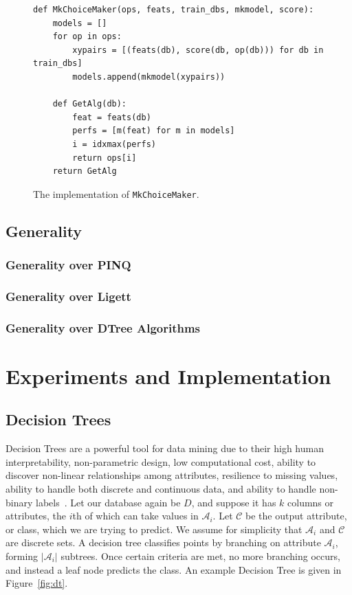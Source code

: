 \documentclass[11pt]{report}
\renewcommand{\t}[1]{\texttt{#1}}
\begin{document}
\begin{figure}
\begin{lstlisting}[style=MyPythonStyle]
def MkChoiceMaker(ops, feats, train_dbs, mkmodel, score):
    models = []
    for op in ops:
        xypairs = [(feats(db), score(db, op(db))) for db in train_dbs]
        models.append(mkmodel(xypairs))

    def GetAlg(db):
        feat = feats(db)
        perfs = [m(feat) for m in models]
        i = idxmax(perfs)
        return ops[i]
    return GetAlg
\end{lstlisting}
\caption{The implementation of \t{MkChoiceMaker}. }\label{fig:choicemaker}
\end{figure}
\section{Generality}
\subsection{Generality over PINQ}
\subsection{Generality over Ligett}
\subsection{Generality over DTree Algorithms}
\chapter{Experiments and Implementation}\label{ch:experiments}
\section{Decision Trees}

Decision Trees are a powerful tool for data mining due to their high human interpretability, non-parametric design, low computational cost, ability to discover non-linear relationships among attributes, resilience to missing values, ability to handle both discrete and continuous data, and ability to handle non-binary labels~\cite{Fletcher:2016}. Let our database again be $D$, and suppose it has $k$ columns or attributes, the $i$th of which can take values in $\mathcal{A}_i$. Let $\mathcal{C}$ be the output attribute, or class, which we are trying to predict. We assume for simplicity that $\mathcal{A}_i$ and $\mathcal{C}$ are discrete sets. A decision tree classifies points by branching on attribute $\mathcal{A}_i$, forming $|\mathcal{A}_i|$ subtrees. Once certain criteria are met, no more branching occurs, and instead a leaf node predicts the class. An example Decision Tree is given in Figure~\ref{fig:dt}.
\end{document}
